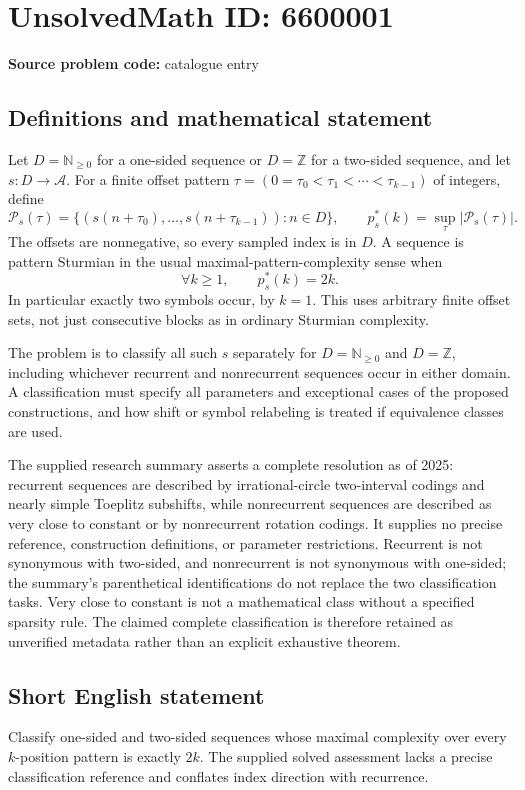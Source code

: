 \documentclass[11pt]{article}
\newcommand{\N}{\mathbb{N}}
\newcommand{\Z}{\mathbb{Z}}
\begin{document}
\section*{UnsolvedMath ID: 6600001}
\textbf{Source problem code:} catalogue entry
\subsection{Definitions and mathematical statement}
Let \(D=\N_{\ge0}\) for a one-sided sequence or \(D=\Z\) for a two-sided sequence, and let \(s:D\to\mathcal A\). For a finite offset pattern \(\tau=(0=\tau_0<\tau_1<\cdots<\tau_{k-1})\) of integers, define
\[
\mathcal P_s(\tau)=\{(s(n+\tau_0),\ldots,s(n+\tau_{k-1})):n\in D\},
\qquad
p_s^*(k)=\sup_\tau|\mathcal P_s(\tau)|.
\]
The offsets are nonnegative, so every sampled index is in \(D\). A sequence is pattern Sturmian in the usual maximal-pattern-complexity sense when
\[
\forall k\ge1,\qquad p_s^*(k)=2k.
\]
In particular exactly two symbols occur, by \(k=1\). This uses arbitrary finite offset sets, not just consecutive blocks as in ordinary Sturmian complexity.

The problem is to classify all such \(s\) separately for \(D=\N_{\ge0}\) and \(D=\Z\), including whichever recurrent and nonrecurrent sequences occur in either domain. A classification must specify all parameters and exceptional cases of the proposed constructions, and how shift or symbol relabeling is treated if equivalence classes are used.

The supplied research summary asserts a complete resolution as of 2025: recurrent sequences are described by irrational-circle two-interval codings and nearly simple Toeplitz subshifts, while nonrecurrent sequences are described as very close to constant or by nonrecurrent rotation codings. It supplies no precise reference, construction definitions, or parameter restrictions. Recurrent is not synonymous with two-sided, and nonrecurrent is not synonymous with one-sided; the summary's parenthetical identifications do not replace the two classification tasks. Very close to constant is not a mathematical class without a specified sparsity rule. The claimed complete classification is therefore retained as unverified metadata rather than an explicit exhaustive theorem.
\subsection{Short English statement}
Classify one-sided and two-sided sequences whose maximal complexity over every \(k\)-position pattern is exactly \(2k\). The supplied solved assessment lacks a precise classification reference and conflates index direction with recurrence.
\end{document}
